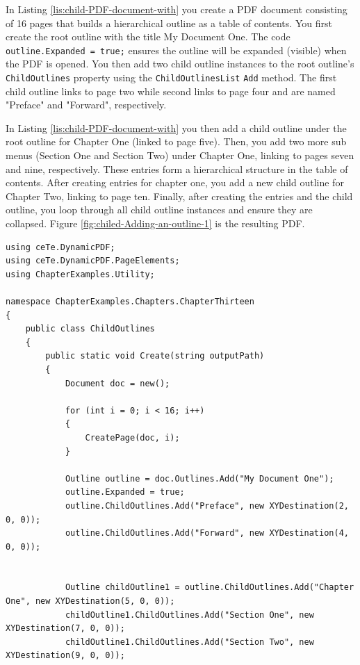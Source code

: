 \documentclass[american]{tufte-book}
\numberwithin{equation}{section}
\numberwithin{figure}{section}
\begin{document}
{In Listing \ref{lis:child-PDF-document-with} you create a PDF document
consisting of 16 pages that builds a hierarchical outline as a table
of contents. You first create the root outline with the title \textquotedbl My
Document One\textquotedbl . The code \texttt{outline.Expanded = true;}
ensures the outline will be expanded (visible) when the PDF is opened.
You then add two child outline instances to the root outline's \texttt{ChildOutlines}
property using the \texttt{ChildOutlinesList} \texttt{Add} method.
The first child outline links to page two while second links to page
four and are named "Preface" and "Forward", respectively.

In Listing \ref{lis:child-PDF-document-with} you then add a child
outline under the root outline for Chapter One (linked to page five).
Then, you add two more sub menus (Section One and Section Two) under
Chapter One, linking to pages seven and nine, respectively. These
entries form a hierarchical structure in the table of contents. After
creating entries for chapter one, you add a new child outline for Chapter
Two, linking to page ten. Finally, after creating the entries and the child outline, you loop through all child outline
instances and ensure they are collapsed. Figure \ref{fig:chiled-Adding-an-outline-1}
is the resulting PDF.
\bgroup{}
\begin{lstlisting}[caption={PDF document with child outlines.},label={lis:child-PDF-document-with},basicstyle={\footnotesize\ttfamily},breaklines=true]
using ceTe.DynamicPDF;
using ceTe.DynamicPDF.PageElements;
using ChapterExamples.Utility;

namespace ChapterExamples.Chapters.ChapterThirteen
{
    public class ChildOutlines
    {
        public static void Create(string outputPath)
        {
            Document doc = new();

            for (int i = 0; i < 16; i++)
            {
                CreatePage(doc, i);
            }

            Outline outline = doc.Outlines.Add("My Document One");
            outline.Expanded = true;
            outline.ChildOutlines.Add("Preface", new XYDestination(2, 0, 0));
            outline.ChildOutlines.Add("Forward", new XYDestination(4, 0, 0));


            Outline childOutline1 = outline.ChildOutlines.Add("Chapter One", new XYDestination(5, 0, 0));
            childOutline1.ChildOutlines.Add("Section One", new XYDestination(7, 0, 0));
            childOutline1.ChildOutlines.Add("Section Two", new XYDestination(9, 0, 0));


\end{lstlisting}}
\end{document}
